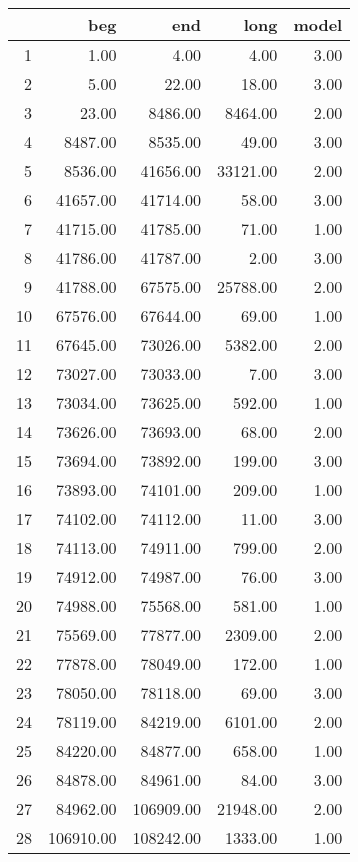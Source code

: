 \begingroup\tiny
\begin{tabular}{rrrrr}
  \hline
 & beg & end & long & model \\ 
  \hline
1 & 1.00 & 4.00 & 4.00 & 3.00 \\ 
  2 & 5.00 & 22.00 & 18.00 & 3.00 \\ 
  3 & 23.00 & 8486.00 & 8464.00 & 2.00 \\ 
  4 & 8487.00 & 8535.00 & 49.00 & 3.00 \\ 
  5 & 8536.00 & 41656.00 & 33121.00 & 2.00 \\ 
  6 & 41657.00 & 41714.00 & 58.00 & 3.00 \\ 
  7 & 41715.00 & 41785.00 & 71.00 & 1.00 \\ 
  8 & 41786.00 & 41787.00 & 2.00 & 3.00 \\ 
  9 & 41788.00 & 67575.00 & 25788.00 & 2.00 \\ 
  10 & 67576.00 & 67644.00 & 69.00 & 1.00 \\ 
  11 & 67645.00 & 73026.00 & 5382.00 & 2.00 \\ 
  12 & 73027.00 & 73033.00 & 7.00 & 3.00 \\ 
  13 & 73034.00 & 73625.00 & 592.00 & 1.00 \\ 
  14 & 73626.00 & 73693.00 & 68.00 & 2.00 \\ 
  15 & 73694.00 & 73892.00 & 199.00 & 3.00 \\ 
  16 & 73893.00 & 74101.00 & 209.00 & 1.00 \\ 
  17 & 74102.00 & 74112.00 & 11.00 & 3.00 \\ 
  18 & 74113.00 & 74911.00 & 799.00 & 2.00 \\ 
  19 & 74912.00 & 74987.00 & 76.00 & 3.00 \\ 
  20 & 74988.00 & 75568.00 & 581.00 & 1.00 \\ 
  21 & 75569.00 & 77877.00 & 2309.00 & 2.00 \\ 
  22 & 77878.00 & 78049.00 & 172.00 & 1.00 \\ 
  23 & 78050.00 & 78118.00 & 69.00 & 3.00 \\ 
  24 & 78119.00 & 84219.00 & 6101.00 & 2.00 \\ 
  25 & 84220.00 & 84877.00 & 658.00 & 1.00 \\ 
  26 & 84878.00 & 84961.00 & 84.00 & 3.00 \\ 
  27 & 84962.00 & 106909.00 & 21948.00 & 2.00 \\ 
  28 & 106910.00 & 108242.00 & 1333.00 & 1.00 \\ 

\end{tabular}
